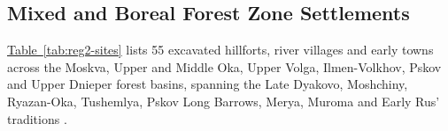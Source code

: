 \IfFileExists{../../_shared/template/intellte.cls}{\documentclass[10pt,onecolumn]{../../_shared/template/intellte}}{\documentclass[10pt,onecolumn]{intellte}}
\providecommand{\crdxref}[2]{\hyperref[#2]{#1~\ref*{#2}}}
\begin{document}
\subsection{Mixed and Boreal Forest Zone
Settlements}\label{mixed-and-boreal-forest-zone-settlements}

\crdxref{Table}{tab:reg2-sites} lists 55 excavated hillforts, river
villages and early towns across the Moskva, Upper and Middle Oka, Upper
Volga, Ilmen-Volkhov, Pskov and Upper Dnieper forest basins, spanning
the Late Dyakovo, Moshchiny, Ryazan-Oka, Tushemlya, Pskov Long Barrows,
Merya, Muroma and Early Rus' traditions
.
\end{document}
